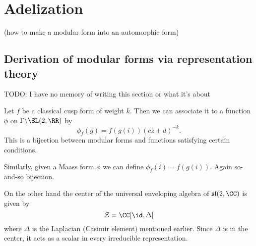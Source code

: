 \chapter{Adelization}
(how to make a modular form into an automorphic form)
\section{Derivation of modular forms via representation theory}
TODO: I have no memory of writing this section or what it's about

Let $f$ be a classical cusp form of weight $k$.
Then we can associate it to a function $\phi$ on $\Gamma \backslash \SL(2, \RR)$ by
\[ \phi_f(g) = f(g(i)) (cz+d)^{-k}. \]
This is a bijection between modular forms and functions
satisfying certain conditions.

Similarly, given a Maass form $\phi$ we can define $\phi_f(i) = f(g(i))$.
Again so-and-so bijection.

On the other hand the center of the universal enveloping algebra
of $\mathfrak{sl}(2,\CC)$ is given by
\[ \mathcal Z = \CC[\id, \Delta] \]
where $\Delta$ is the Laplacian (Casimir element) mentioned earlier.
Since $\Delta$ is in the center, it acts as a scalar in every irreducible representation.

